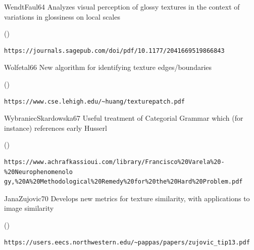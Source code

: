 \begin{bsuppItem}{WendtFaul}{64}
{Analyzes visual perception of glossy textures in the 
context of variations in glossiness on local scales}
\begin{lboxurl}(\currhref)
\begin{lstlisting}
https://journals.sagepub.com/doi/pdf/10.1177/2041669519866843
\end{lstlisting}
\end{lboxurl}
\end{bsuppItem}

\begin{bsuppItem}{Wolfetal}{66}
{New algorithm for identifying texture edges/boundaries}
\begin{lboxurl}(\currhref)
\begin{lstlisting}
https://www.cse.lehigh.edu/~huang/texturepatch.pdf
\end{lstlisting}
\end{lboxurl}
\end{bsuppItem}

\begin{bsuppItem}{WybraniecSkardowska}{67}
{Useful treatment of Categorial Grammar which 
(for instance) references early Husserl}
\begin{lboxurl}(\currhref)
\begin{lstlisting}
https://www.achrafkassioui.com/library/Francisco%20Varela%20-%20Neurophenomenolo
gy,%20A%20Methodological%20Remedy%20for%20the%20Hard%20Problem.pdf
\end{lstlisting}
\end{lboxurl}
\end{bsuppItem}

\begin{bsuppItem}{JanaZujovic}{70}
{Develops new metrics for texture similarity, 
with applications to image similarity}
\begin{lboxurl}(\currhref)
\begin{lstlisting}
https://users.eecs.northwestern.edu/~pappas/papers/zujovic_tip13.pdf
\end{lstlisting}
\end{lboxurl}
\end{bsuppItem}

